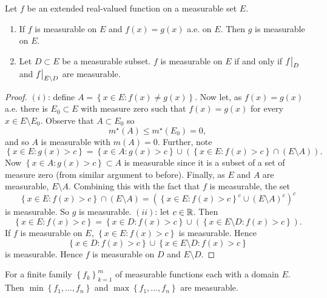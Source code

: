 \begin{proposition}[]
	Let $f$ be an extended real-valued function on a measurable set $E$.
	\begin{enumerate}
		\item If $f$ is measurable on $E$ and $f(x) = g(x)$ a.e. on $E$.
			Then $g$ is measurable on $E$.

		\item Let $D \subset E$ be a measurable subset.
			$f$ is measurable on $E$ if and only if
			$\restr fD$ and $\restr f{E \setminus D}$ are measurable.
	\end{enumerate}
\end{proposition}

\begin{proof}
	$(i)$: define 
	$
		A =
		\left\{
			x \in E: f(x) \neq g(x)
		\right\}.
	$
	Now let, as $f(x) = g(x)$ a.e. there is $E_0 \subset E$ with measure zero
	such that $f(x) = g(x)$ for every $x \in E \setminus E_0$.
	Observe that $A \subset E_0$ so
	\[
		m^\star(A) \leq m^\star(E_0) = 0,
	\]
	and so $A$ is measurable with $m(A) = 0$.
	Further, note
	\[
		\left\{
			x \in E: g(x) > c
		\right\}
		= \left\{
			x \in A: g(x) > c
		\right\} \cup \left( 
			\left\{
				x \in E: f(x) > c
			\right\}
			\cap 
			\left( 
				E \setminus A 
			\right)
		\right).
	\]
	Now
	$
		\left\{
			x \in A: g(x) > c
		\right\}
		\subset A
	$
	is measurable since it is a subset of a set of measure zero
	(from similar argument to before).
	Finally, as $E$ and $A$ are measurable, $E \setminus A$.
	Combining this with the fact that $f$ is measurable,
	the set
	\[
		\left\{
			x \in E : f(x) > c
		\right\}
		\cap (E \setminus A)
		=
		\left(
			\left\{
				x \in E: f(x) > c
			\right\}^c
			\cup (E \setminus A)^c
		\right)^c
	\]
	is measurable.
	So $g$ is measurable.
	$(ii)$: let $c \in \mathbb{R}$.
	Then
	\[
		\left\{
			x \in E: f(x) > c
		\right\}
		=
		\left\{
			x \in D: f(x) > c
		\right\}
		\cup 
		\left( 
			\left\{
				x \in E \setminus D: f(x) > c
			\right\} 
		\right).
	\]
	If $f$ is measurable on $E$,
	$
		\left\{
			x \in E: f(x) > c
		\right\}
	$
	is measurable.
	Hence
	\[
		\left\{
			x \in D : f(x) > c
		\right\}
		\cup
		\left\{
			x \in E \setminus D: f(x) > c
		\right\}
	\]
	is measurable.
	Hence $f$ is measurable on $D$ and $E \setminus D$.
\end{proof}

\begin{proposition}[]
	For a finite family
	$
		\left\{
			f_k
		\right\}_{k=1}^m
	$
	of measurable functions each with a domain $E$.
	Then
	$
		\min
		\left\{
			f_1, \ldots, f_n
		\right\}
	$
	and
	$
		\max
		\left\{
			f_1, \ldots, f_n
		\right\}
	$
	are measurable.
\end{proposition}

